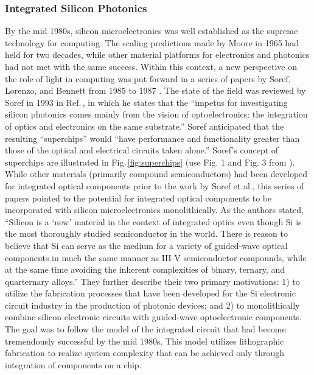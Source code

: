 
\subsubsection{\label{sec:integrated_silicon_photonics}Integrated Silicon Photonics}
By the mid 1980s, silicon microelectronics was well established as the supreme technology for computing. The scaling predictions made by Moore in 1965 \cite{mo1965} had held for two decades, while other material platforms for electronics and photonics had not met with the same success. Within this context, a new perspective on the role of light in computing was put forward in a series of papers by Soref, Lorenzo, and Bennett from 1985 to 1987 \cite{sole1985,sole1986,sobe1987}. The state of the field was reviewed by Soref in 1993 in Ref.\,\cite{so1993}, in which he states that the ``impetus for investigating silicon photonics comes mainly from the vision of optoelectronics: the integration of optics and electronics on the same substrate.'' Soref anticipated that the resulting ``superchips'' would ``have performance and functionality greater than those of the optical and electrical circuits taken alone.'' Soref's concept of superchips are illustrated in Fig.\,\ref{fig:superchips} (use Fig. 1 and Fig. 3 from \cite{so1993}). While other materials (primarily compound semiconductors) had been developed for integrated optical components prior to the work by Soref et al., this series of papers pointed to the potential for integrated optical components to be incorporated with silicon microelectronics monolithically. As the authors stated, ``Silicon is a `new' material in the context of integrated optics even though Si is the most thoroughly studied semiconductor in the world. There is reason to believe that Si can serve as the medium for a variety of guided-wave optical components in much the same manner as III-V semiconductor compounds, while at the same time avoiding the inherent complexities of binary, ternary, and quarternary alloys.'' \cite{sole1986} They further describe their two primary motivations: 1) to utilize the fabrication processes that have been developed for the Si electronic circuit industry in the production of photonic devices; and 2) to monolithically combine silicon electronic circuits with guided-wave optoelectronic components. The goal was to follow the model of the integrated circuit that had become tremendously successful by the mid 1980s. This model utilizes lithographic fabrication to realize system complexity that can be achieved only through integration of components on a chip.

